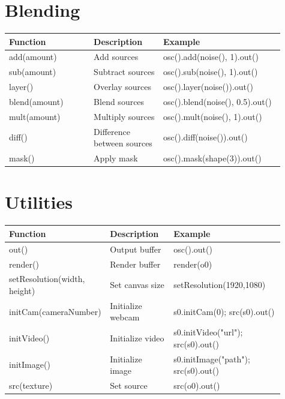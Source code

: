 \documentclass[9pt,oneside]{amsart}
\begin{document}
\section*{Blending}
\begin{tabular}{L{0.28\linewidth}L{0.23\linewidth}L{0.40\linewidth}}
\toprule
\textbf{Function} & \textbf{Description} & \textbf{Example} \\
\midrule
add(amount) & Add sources & osc().add(noise(), 1).out() \\
sub(amount) & Subtract sources & osc().sub(noise(), 1).out() \\
layer() & Overlay sources & osc().layer(noise()).out() \\
blend(amount) & Blend sources & osc().blend(noise(), 0.5).out() \\
mult(amount) & Multiply sources & osc().mult(noise(), 1).out() \\
diff() & Difference between sources & osc().diff(noise()).out() \\
mask() & Apply mask & osc().mask(shape(3)).out() \\
\bottomrule
\end{tabular}

\section*{Utilities}
\begin{tabular}{L{0.28\linewidth}L{0.23\linewidth}L{0.40\linewidth}}
\toprule
\textbf{Function} & \textbf{Description} & \textbf{Example} \\
\midrule
out() & Output buffer & osc().out() \\
render() & Render buffer & render(o0) \\
setResolution(width, height) & Set canvas size & setResolution(1920,1080) \\
initCam(cameraNumber) & Initialize webcam & s0.initCam(0); src(s0).out() \\
initVideo() & Initialize video & s0.initVideo("url"); src(s0).out() \\
initImage() & Initialize image & s0.initImage("path"); src(s0).out() \\
src(texture) & Set source & src(o0).out() \\
\bottomrule
\end{tabular}
\end{document}
